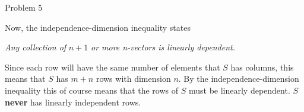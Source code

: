 \begin{problem}{Problem 5}
\begin{highlight}
\begin{enumerate}[label = (\alph*), start = 2]
            Now, the independence-dimension inequality states
    
            \begin{center}
                \textit{Any collection of} $n + 1$ \textit{or more n-vectors is linearly dependent.}
            \end{center}
            Since each row will have the same number of elements that $S$ has columns, this means that $S$ has $m + n$ rows with dimension $n$. By the independence-dimension inequality this of course means that
            the rows of $S$ must be linearly dependent. $S$ \textbf{never} has linearly independent rows.
        \end{enumerate}
    \end{highlight}
\end{problem}

